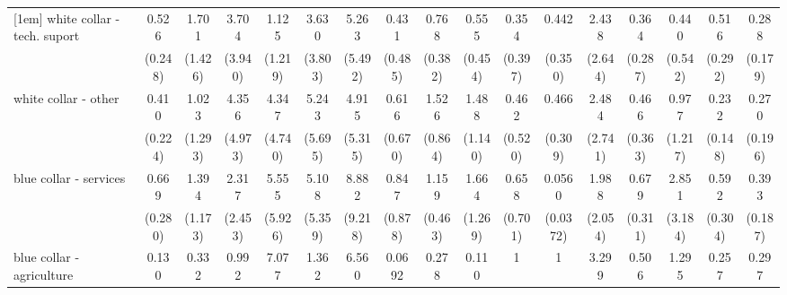 {\begin{tabular}{l*{16}{c}}
[1em]
white collar - tech. suport&       0.526         &       1.701         &       3.704         &       1.125         &       3.630         &       5.263         &       0.431         &       0.768         &       0.555         &       0.354         &       0.442         &       2.438         &       0.364         &       0.440         &       0.516         &       0.288\sym{*}  \\
                    &     (0.248)         &     (1.426)         &     (3.940)         &     (1.219)         &     (3.803)         &     (5.492)         &     (0.485)         &     (0.382)         &     (0.454)         &     (0.397)         &     (0.350)         &     (2.644)         &     (0.287)         &     (0.542)         &     (0.292)         &     (0.179)         \\
[1em]
white collar - other&       0.410         &       1.023         &       4.356         &       4.347         &       5.243         &       4.915         &       0.616         &       1.526         &       1.488         &       0.462         &       0.466         &       2.484         &       0.466         &       0.977         &       0.232\sym{*}  &       0.270         \\
                    &     (0.224)         &     (1.293)         &     (4.973)         &     (4.740)         &     (5.695)         &     (5.315)         &     (0.670)         &     (0.864)         &     (1.140)         &     (0.520)         &     (0.309)         &     (2.741)         &     (0.363)         &     (1.217)         &     (0.148)         &     (0.196)         \\
[1em]
blue collar - services&       0.669         &       1.394         &       2.317         &       5.555         &       5.108         &       8.882\sym{*}  &       0.847         &       1.159         &       1.664         &       0.658         &      0.0560\sym{***}&       1.988         &       0.679         &       2.851         &       0.592         &       0.393\sym{*}  \\
                    &     (0.280)         &     (1.173)         &     (2.453)         &     (5.926)         &     (5.359)         &     (9.218)         &     (0.878)         &     (0.463)         &     (1.269)         &     (0.701)         &    (0.0372)         &     (2.054)         &     (0.311)         &     (3.184)         &     (0.304)         &     (0.187)         \\
[1em]
blue collar - agriculture&       0.130         &       0.332         &       0.992         &       7.077         &       1.362         &       6.560         &      0.0692         &       0.278         &       0.110         &           1         &           1         &       3.299         &       0.506         &       1.295         &       0.257         &       0.297         \\

\end{tabular}}
